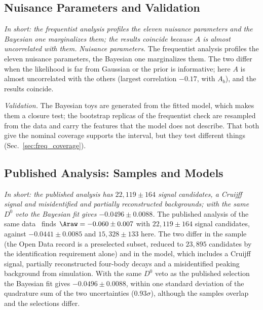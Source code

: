 \subsection{Nuisance Parameters and Validation}
\emph{In short: the frequentist analysis profiles the eleven nuisance parameters and the Bayesian one marginalizes them; the results coincide because $A$ is almost uncorrelated with them.}
\emph{Nuisance parameters.} The frequentist analysis profiles the eleven nuisance parameters, the Bayesian one marginalizes them. The two differ when the likelihood is far from Gaussian or the prior is informative; here $A$ is almost uncorrelated with the others (largest correlation $-0.17$, with $A_b$), and the results coincide.

\emph{Validation.} The Bayesian toys are generated from the fitted model, which makes them a closure test; the bootstrap replicas of the frequentist check are resampled from the data and carry the features that the model does not describe. That both give the nominal coverage supports the interval, but they test different things (Sec.~\ref{sec:freq_coverage}).

\subsection{Published Analysis: Samples and Models}
\emph{In short: the published analysis has $22{,}119\pm164$ signal candidates, a Cruijff signal and misidentified and partially reconstructed backgrounds; with the same $D^0$ veto the Bayesian fit gives $-0.0496\pm0.0088$.}
The published analysis of the same data~\cite{lhcb_cpv_2013} finds $\Araw=-0.060\pm0.007$ with $22{,}119\pm164$ signal candidates, against $-0.0441\pm0.0085$ and $15{,}328\pm133$ here. The two differ in the sample (the Open Data record is a preselected subset, reduced to $23{,}895$ candidates by the identification requirement alone) and in the model, which includes a Cruijff signal, partially reconstructed four-body decays and a misidentified peaking background from simulation. With the same $D^0$ veto as the published selection the Bayesian fit gives $-0.0496\pm0.0088$, within one standard deviation of the quadrature sum of the two uncertainties ($0.93\sigma$), although the samples overlap and the selections differ.

